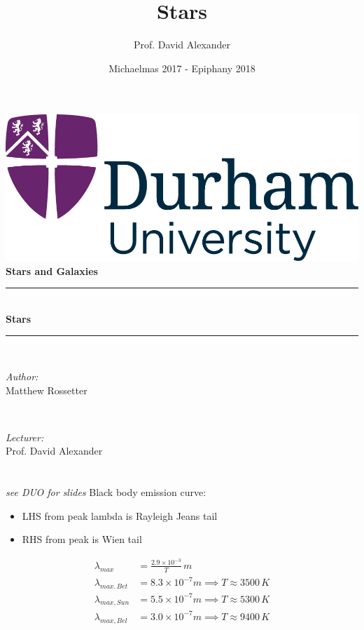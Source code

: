 \documentclass[a4paper,11pt,normalem]{article}
\title{Stars}
\author{Prof. David Alexander}
\date{Michaelmas 2017 - Epiphany 2018}
\newcommand{\HRule}{\rule{\linewidth}{0.5mm}}
\begin{document}
{\centering
{\includegraphics[scale=0.5]{../../logo0.png}\hfill{\Large\bfseries{}}}\\[1.5cm]
{\LARGE\bfseries Stars and Galaxies}\\[0.5cm]
\HRule \\[0.3cm]
{\huge\bfseries Stars}\\[0.1cm]
\HRule \\[1cm]}
\begin{center}
\begin{minipage}{0.4\textwidth}
    \begin{flushleft} \large
        \emph{Author:} \\ Matthew Rossetter
    \end{flushleft}
\end{minipage}~
\begin{minipage}{0.4\textwidth}
    \begin{flushright} \large
        \emph{Lecturer:} \\ Prof. David Alexander
    \end{flushright}
\end{minipage}
\end{center}

\section{}
\emph{see DUO for slides}
Black body emission curve:
    \begin{itemize}
        \item LHS from peak lambda is Rayleigh Jeans tail
        \item RHS from peak is Wien tail
    \end{itemize}

\begin{align*}
    \lambda_{max} &= \frac{2.9 \times 10^{-3}}{T} \, m \\
    \lambda_{max.\,Bet} &= 8.3 \times 10^{-7}m \implies T \approx 3500\,K \\
    \lambda_{max,Sun} &= 5.5 \times 10^{-7}m \implies T \approx 5300\,K \\
    \lambda_{max, Bel} &= 3.0 \times 10^{-7} m \implies T \approx 9400\,K\\
\end{align*}
\end{document}
